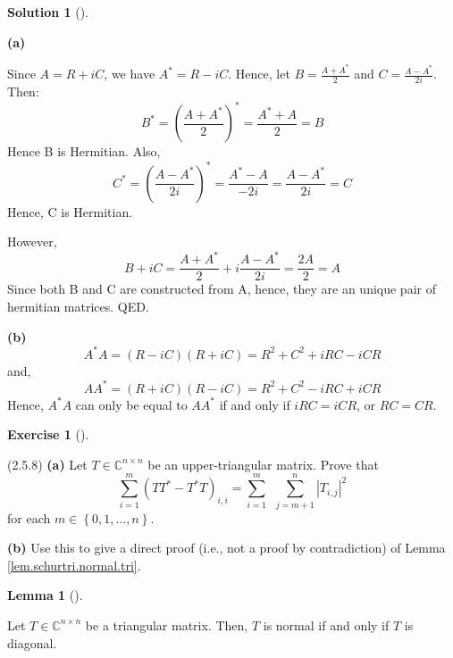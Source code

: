 \documentclass[numbers=enddot,12pt,final,onecolumn,notitlepage]{scrartcl}
\newcounter{exer}
\newcounter{sol}
\theoremstyle{definition}
\newtheorem{lem}[theo]{Lemma}
\newenvironment{lemma}[1][]
{\begin{lem}[#1]\begin{leftbar}}
        {\end{leftbar}\end{lem}}
\newtheorem{exmp}[exer]{Exercise}
\newenvironment{exercise}[1][]
{\begin{exmp}[#1]\begin{leftbar}}
        {\end{leftbar}\end{exmp}}
\newtheorem{solu}[sol]{Solution}
\newenvironment{solution}[1][]
{\begin{solu}[#1]\begin{leftbar}}
        {\end{leftbar}\end{solu}}
\let\sumnonlimits\sum
\renewcommand{\sum}{\sumnonlimits\limits}
\begin{document}
\begin{solution}
	\textbf{(a)}

	Since $A = R + iC$, we have $A^{\ast} = R - iC$. Hence, let $B = \frac{A + A^{\ast}}{2}$ and $C = \frac{A - A^{\ast}}{2i}$. Then:
	\[
		B^{\ast} = (\frac{A + A^{\ast}}{2})^{\ast} = \frac{A^{\ast} + A}{2} = B
	\]
	Hence B is Hermitian.
	Also,
	\[
		C^{\ast} = (\frac{A - A^{\ast}}{2i})^{\ast} = \frac{A^{\ast} - A}{-2i} = \frac{A - A^{\ast}}{2i} = C
	\]
	Hence, C is Hermitian.

	However,
	\[
		B + iC = \frac{A + A^{\ast}}{2} + i\frac{A - A^{\ast}}{2i} = \frac{2A}{2} = A
	\]
	Since both B and C are constructed from A, hence, they are an unique pair of hermitian matrices. QED.

	\textbf{(b)}
	\[
		A^{\ast}A = (R - iC)(R + iC) = R^2 + C^2 + iRC - iCR
	\]
	and,
	\[
		AA^{\ast} = (R + iC)(R - iC) = R^2 + C^2 - iRC + iCR
	\]
	Hence, $A^{\ast}A$ can only be equal to $AA^{\ast}$ if and only if $iRC = iCR$, or $RC = CR$.


\end{solution}

\begin{exercise}
	\label{lem.schurtri.normal.tri.2} (2.5.8) \textbf{(a)} Let $T\in
		\mathbb{C}^{n\times n}$ be an upper-triangular matrix. Prove that%
	\[
		\sum_{i=1}^{m}\left(  TT^{\ast}-T^{\ast}T\right)  _{i,i}=\sum_{i=1}%
		^{m}\ \ \sum_{j=m+1}^{n}\left\vert T_{i,j}\right\vert ^{2}%
	\]
	for each $m\in\left\{  0,1,\ldots,n\right\}  $. \medskip

	\textbf{(b)} Use this to give a direct proof (i.e., not a proof by
	contradiction) of Lemma \ref{lem.schurtri.normal.tri}.

	\begin{lemma}
		\label{lem.schurtri.normal.tri}Let $T\in\mathbb{C}^{n\times n}$ be a
		triangular matrix. Then, $T$ is normal if and only if $T$ is diagonal.
	\end{lemma}
\end{exercise}
\end{document}
